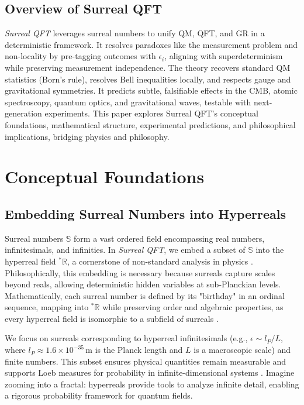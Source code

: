 \documentclass{article}
\begin{document}
\subsection{Overview of Surreal QFT}
\textit{Surreal QFT} leverages surreal numbers to unify QM, QFT, and GR in a deterministic framework. It resolves paradoxes like the measurement problem and non-locality by pre-tagging outcomes with \(\epsilon_i\), aligning with superdeterminism while preserving measurement independence. The theory recovers standard QM statistics (Born's rule), resolves Bell inequalities locally, and respects gauge and gravitational symmetries. It predicts subtle, falsifiable effects in the CMB, atomic spectroscopy, quantum optics, and gravitational waves, testable with next-generation experiments. This paper explores Surreal QFT's conceptual foundations, mathematical structure, experimental predictions, and philosophical implications, bridging physics and philosophy.

\section{Conceptual Foundations}
\subsection{Embedding Surreal Numbers into Hyperreals}
Surreal numbers \(\mathbb{S}\) form a vast ordered field encompassing real numbers, infinitesimals, and infinities. In \textit{Surreal QFT}, we embed a subset of \(\mathbb{S}\) into the hyperreal field \({}^*\mathbb{R}\), a cornerstone of non-standard analysis in physics \cite{Goldblatt1998}. Philosophically, this embedding is necessary because surreals capture scales beyond reals, allowing deterministic hidden variables at sub-Planckian levels. Mathematically, each surreal number is defined by its "birthday" in an ordinal sequence, mapping into \({}^*\mathbb{R}\) while preserving order and algebraic properties, as every hyperreal field is isomorphic to a subfield of surreals \cite{Ehrlich2012}.

We focus on surreals corresponding to hyperreal infinitesimals (e.g., \(\epsilon \sim l_P / L\), where \(l_P \approx 1.6 \times 10^{-35} \, \text{m}\) is the Planck length and \(L\) is a macroscopic scale) and finite numbers. This subset ensures physical quantities remain measurable and supports Loeb measures for probability in infinite-dimensional systems \cite{Albeverio1986}. Imagine zooming into a fractal: hyperreals provide tools to analyze infinite detail, enabling a rigorous probability framework for quantum fields.
\end{document}
